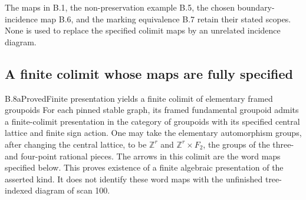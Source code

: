 The maps in B.1, the non-preservation example B.5, the chosen
boundary-incidence map B.6, and the marking equivalence B.7
retain their stated scopes.  None is used to replace the
specified colimit maps by an unrelated incidence diagram.

\subsection{A finite colimit whose maps are fully specified}

\begin{result}{B.8a}{Proved}{Finite presentation yields a finite colimit of elementary framed groupoids}
For each pinned stable graph, its framed fundamental groupoid admits
a finite-colimit presentation in the category of groupoids with its
specified central lattice and finite sign action.  One may take the
elementary automorphism groups, after changing the central lattice,
to be $\mathbb Z^r$ and $\mathbb Z^r\times F_2$, the groups of the
three- and four-point rational pieces.  The arrows in this colimit
are the word maps specified below.  This proves existence of a
finite algebraic presentation of the asserted kind.  It does not
identify these word maps with the unfinished tree-indexed diagram
of scan 100.
\end{result}
